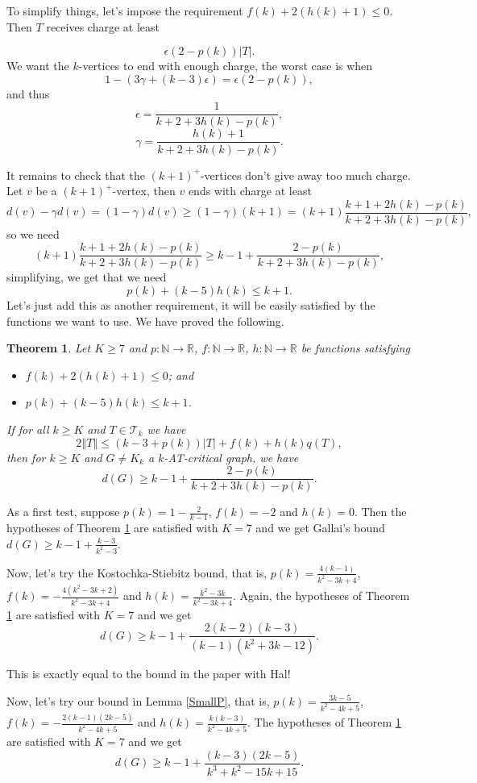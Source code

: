 \documentclass[12pt]{article}
\theoremstyle{plain}
\newtheorem{thm}{Theorem}[section]
\theoremstyle{definition}
\theoremstyle{remark}
\newcommand{\fancy}[1]{\mathcal{#1}}
\newcommand{\IN}{\mathbb{N}}
\newcommand{\IR}{\mathbb{R}}
\newcommand{\T}{\fancy{T}}
\newcommand{\card}[1]{\left|#1\right|}
\newcommand{\size}[1]{\left\Vert#1\right\Vert}
\newcommand{\func}[3]{#1\colon #2 \rightarrow #3}
\newcommand{\parens}[1]{\left( #1 \right)}
\begin{document}
To simplify things, let's impose the requirement $f(k) + 2(h(k) + 1) \le 0$.  Then $T$ receives charge at least

\[\epsilon\parens{2-p(k)}\card{T}.\]
We want the $k$-vertices to end with enough charge, the worst case is when
\[1 - (3\gamma + (k-3)\epsilon) = \epsilon\parens{2-p(k)},\]
and thus
\[\epsilon = \frac{1}{k+2 + 3h(k) - p(k)},\]
\[\gamma = \frac{h(k)+1}{k+2 + 3h(k) - p(k)}.\]

It remains to check that the $(k+1)^+$-vertices don't give away too much charge.  Let $v$ be a $(k+1)^+$-vertex, then $v$ ends with charge at least
\[d(v) - \gamma d(v) = (1-\gamma)d(v) \ge (1-\gamma)(k+1) = (k+1)\frac{k+1 + 2h(k) - p(k)}{k+2 + 3h(k) - p(k)},\]
so we need
\[(k+1)\frac{k+1 + 2h(k) - p(k)}{k+2 + 3h(k) - p(k)} \ge k-1 + \frac{2-p(k)}{k+2 + 3h(k) - p(k)},\]
simplifying, we get that we need
\[p(k) + (k-5)h(k) \le k+1.\]
Let's just add this as another requirement, it will be easily satisfied by the functions we want to use.  We have proved the following.

\begin{thm}\label{UberTheorem}
	Let $K \ge 7$ and $\func{p}{\IN}{\IR}$, $\func{f}{\IN}{\IR}$, $\func{h}{\IN}{\IR}$ be functions satisfying
	\begin{itemize}
		\item $f(k) + 2(h(k) + 1) \le 0$; and
		\item $p(k) + (k-5)h(k) \le k+1$.
	\end{itemize}
    If for all $k \ge K$ and $T \in \T_k$ we have
	\[2\size{T} \le (k-3 + p(k))\card{T} + f(k) + h(k)q(T),\]
	then for $k \ge K$ and $G \ne K_k$ a $k$-AT-critical graph, we have
	\[d(G) \ge k-1 + \frac{2-p(k)}{k+2 + 3h(k) - p(k)}.\]
\end{thm}

As a first test, suppose $p(k) = 1 - \frac{2}{k-1}$, $f(k) = -2$ and $h(k) = 0$.  Then the hypotheses of Theorem \ref{UberTheorem} are satisfied with $K=7$ and we get Gallai's bound $d(G) \ge k-1 + \frac{k-3}{k^2-3}$. 

Now, let's try the Kostochka-Stiebitz bound, that is, $p(k) = \frac{4(k-1)}{k^2 - 3k + 4}$, $f(k) = -\frac{4(k^2-3k+2)}{k^2-3k+4}$ and $h(k) = \frac{k^2 - 3k}{k^2-3k+4}$.  Again, the hypotheses of Theorem \ref{UberTheorem} are satisfied with $K=7$ and we get
\[d(G) \ge k-1 + \frac{2(k-2)(k-3)}{(k-1)(k^2 + 3k - 12)}.\]

This is exactly equal to the bound in the paper with Hal!  

Now, let's try our bound in
Lemma \ref{SmallP}, that is, $p(k) = \frac{3k-5}{k^2 - 4k + 5}$, $f(k) = -\frac{2(k-1)(2k-5)}{k^2 - 4k + 5}$ and $h(k) = \frac{k(k-3)}{k^2 - 4k + 5}$.  The hypotheses of Theorem \ref{UberTheorem} are satisfied with $K=7$ and we get
 \[d(G) \ge k-1 + \frac{(k-3)(2k-5)}{k^3 + k^2 - 15k + 15}.\]
 
\end{document}
